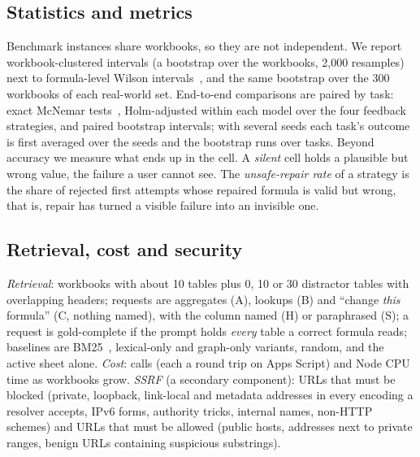 \subsection{Statistics and metrics}
\label{sec:statsmethod}
Benchmark instances share workbooks, so they are not independent. We report workbook-clustered intervals (a bootstrap over the \accWorkbooks{} workbooks, 2{,}000 resamples) next to formula-level Wilson intervals~\cite{wilson1927}, and the same bootstrap over the 300 workbooks of each real-world set. End-to-end comparisons are paired by task: exact McNemar tests~\cite{mcnemar1947}, Holm-adjusted within each model over the four feedback strategies, and paired bootstrap intervals; with several seeds each task's outcome is first averaged over the seeds and the bootstrap runs over tasks. Beyond accuracy we measure what ends up in the cell. A \emph{silent} cell holds a plausible but wrong value, the failure a user cannot see. The \emph{unsafe-repair rate} of a strategy is the share of rejected first attempts whose repaired formula is valid but wrong, that is, repair has turned a visible failure into an invisible one.

\subsection{Retrieval, cost and security}
\emph{Retrieval}: workbooks with about 10 tables plus 0, 10 or 30 distractor tables with overlapping headers; requests are aggregates (A), lookups (B) and ``change \emph{this} formula'' (C, nothing named), with the column named (H) or paraphrased (S); a request is gold-complete if the prompt holds \emph{every} table a correct formula reads; baselines are BM25~\cite{robertson2009bm25}, lexical-only and graph-only variants, random, and the active sheet alone. \emph{Cost}:  calls (each a round trip on Apps Script) and Node CPU time as workbooks grow. \emph{SSRF} (a secondary component): URLs that must be blocked (private, loopback, link-local and metadata addresses in every encoding a resolver accepts, IPv6 forms, authority tricks, internal names, non-HTTP schemes) and URLs that must be allowed (public hosts, addresses next to private ranges, benign URLs containing suspicious substrings).
